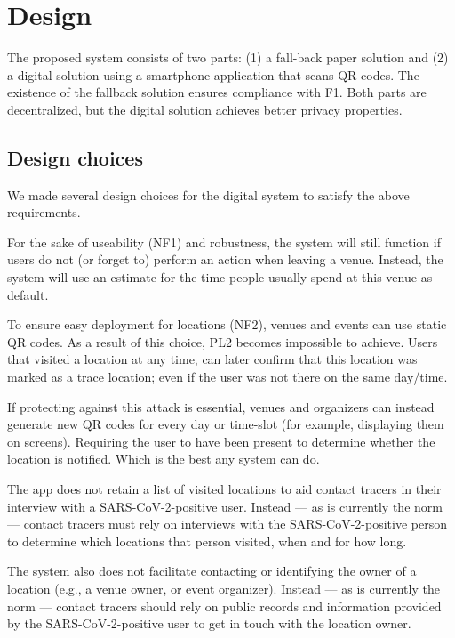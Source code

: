 \section{Design}
The proposed system consists of two parts: (1) a fall-back paper solution and (2) a digital solution using a smartphone application that scans QR codes. The existence of the fallback solution ensures compliance with F1. Both parts are decentralized, but the digital solution achieves better privacy properties.

\subsection{Design choices}
We made several design choices for the digital system to satisfy the above requirements.

 For the sake of useability (NF1) and robustness, the system will still function if users do not (or forget to) perform an action when leaving a venue. Instead, the system will use an estimate for the time people usually spend at this venue as default.

 To ensure easy deployment for locations (NF2), venues and events can use static QR codes. As a result of this choice, PL2 becomes impossible to achieve. Users that visited a location at any time, can later confirm that this location was marked as a trace location; even if the user was not there on the same day/time.

If protecting against this attack is essential, venues and organizers can instead generate new QR codes for every day or time-slot (for example, displaying them on screens). Requiring the user to have been present to determine whether the location is notified. Which is the best any system can do.

 The app does not retain a list of visited locations to aid contact tracers in their interview with a SARS-CoV-2-positive user. Instead — as is currently the norm — contact tracers must rely on interviews with the SARS-CoV-2-positive person to determine which locations that person visited, when and for how long.

The system also does not facilitate contacting or identifying the owner of a location (e.g., a venue owner, or event organizer). Instead — as is currently the norm — contact tracers should rely on public records and information provided by the SARS-CoV-2-positive user to get in touch with the location owner.

